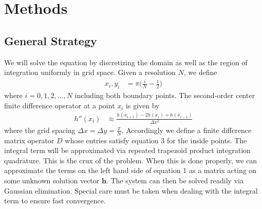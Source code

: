 \documentclass[10pt]{article}
\renewcommand{\vec}[1]{\boldsymbol{#1}}
\begin{document}
\section*{Methods}
\subsection*{General Strategy}
We will solve the equation by discretizing the domain as well as the region of integration uniformly in grid space.
Given a resolution $N$, we define
\begin{align}
    x_i, y_i &= \pi \big( \frac{i}{N} - \frac{1}{2} )
\end{align}
where $i = 0,1,2,...,N$ including both boundary points.
The second-order center finite difference operator at a point $x_i$ is given by
\begin{align}
    h''(x_i) &\approx \frac{h(x_{i+1}) - 2h(x_{i}) + h(x_{i-1})}{\Delta x^2}
\end{align}
where the grid spacing $\Delta x = \Delta y = \frac{\pi}{N}$.
Accordingly we define a finite difference matrix operator $D$ whose entries satisfy equation 3 for the inside points.
The integral term will be approximated via repeated trapezoid product integration quadrature.
This is the crux of the problem.
When this is done properly, we can approximate the terms on the left hand side of equation 1 as a matrix acting on some unknown solution vector $\vec{h}$.
The system can then be solved readily via Gaussian elimination.
Special care must be taken when dealing with the integral term to ensure fast convergence.
\end{document}
